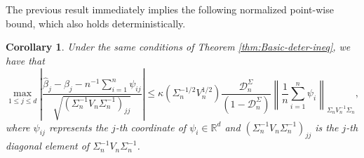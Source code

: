 \documentclass[11pt]{article}
\newtheorem{corollary}[theorem]{Corollary}
\begin{document}


The previous  result immediately implies the following normalized point-wise bound, which also holds deterministically.

\begin{corollary}\label{cor:Max-Statistic-Correct-Scaling}
Under the same conditions of Theorem \ref{thm:Basic-deter-ineq}, we have that 
\[
\max_{1\le j\le d}\left|\frac{\widehat{\beta}_j - \beta_j - n^{-1}\sum_{i=1}^n \psi_{ij}}{\sqrt{(\Sigma_n^{-1}V_n\Sigma_n^{-1})_{jj}}}\right| \le \kappa(\Sigma_n^{-1/2}V_n^{1/2})\frac{\mathcal{D}_n^{\Sigma}}{(1 - \mathcal{D}_n^{\Sigma})}\left\|\frac{1}{n}\sum_{i=1}^n \psi_i\right\|_{\Sigma_n V^{-1}_n\Sigma_n},
\]
where $\psi_{ij}$ represents the $j$-th coordinate of $\psi_i\in\mathbb{R}^d$ and $(\Sigma_n^{-1}V_n\Sigma_n^{-1})_{jj}$ is the $j$-th diagonal element of $\Sigma_n^{-1}V_n\Sigma_n^{-1}$.
\end{corollary}
\end{document}
